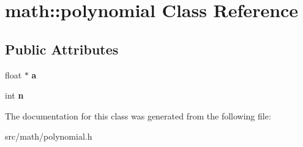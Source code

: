 \hypertarget{classmath_1_1polynomial}{
\section{math::polynomial Class Reference}
\label{classmath_1_1polynomial}
}
\subsection*{Public Attributes}
\begin{DoxyCompactItemize}
\item 
\hypertarget{classmath_1_1polynomial_ab2a0a58ff9c7a98300265bce13c88daa}{
float $\ast$ {\bfseries a}}
\label{classmath_1_1polynomial_ab2a0a58ff9c7a98300265bce13c88daa}

\item 
\hypertarget{classmath_1_1polynomial_ad296013c1a1174bb85ee013a1f6139fa}{
int {\bfseries n}}
\label{classmath_1_1polynomial_ad296013c1a1174bb85ee013a1f6139fa}

\end{DoxyCompactItemize}


The documentation for this class was generated from the following file:\begin{DoxyCompactItemize}
\item 
src/math/polynomial.h\end{DoxyCompactItemize}
